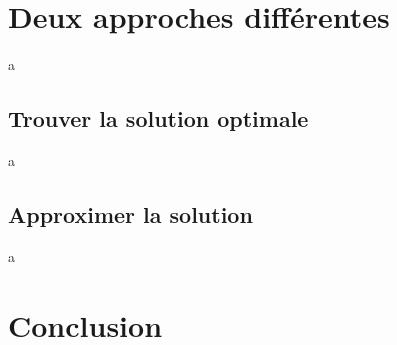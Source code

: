 \documentclass[12pt]{article}
\begin{document}
    \section{Deux approches différentes}
    a
    \subsection{Trouver la solution optimale}
    a
    \subsection{Approximer la solution}
    a
    \section{Conclusion}
\end{document}
